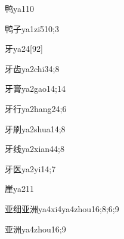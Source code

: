 \begin{verbete}{鸭}{ya1}{10}
\end{verbete}

\begin{verbete}{鸭子}{ya1zi5}{10;3}
\end{verbete}

\begin{verbete}{牙}{ya2}{4}[92]
\end{verbete}

\begin{verbete}{牙齿}{ya2chi3}{4;8}
\end{verbete}

\begin{verbete}{牙膏}{ya2gao1}{4;14}
\end{verbete}

\begin{verbete}{牙行}{ya2hang2}{4;6}
\end{verbete}

\begin{verbete}{牙刷}{ya2shua1}{4;8}
\end{verbete}

\begin{verbete}{牙线}{ya2xian4}{4;8}
\end{verbete}

\begin{verbete}{牙医}{ya2yi1}{4;7}
\end{verbete}

\begin{verbete}{崖}{ya2}{11}
\end{verbete}

\begin{verbete}{亚细亚洲}{ya4xi4ya4zhou1}{6;8;6;9}
\end{verbete}

\begin{verbete}{亚洲}{ya4zhou1}{6;9}
\end{verbete}

